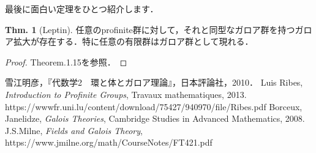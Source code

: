 \documentclass[dvipdfmx,b5paper,papersize]{jsarticle}
\theoremstyle{definition}
\newtheorem{thm}{Thm.}
\begin{document}
最後に面白い定理をひとつ紹介します．
\begin{thm}[Leptin]
  任意のprofinite群に対して，それと同型なガロア群を持つガロア拡大が存在する．特に任意の有限群はガロア群として現れる．
\end{thm}
\begin{proof}
 \cite{Ribes}Theorem.1.15を参照．
\end{proof}


\begin{thebibliography}{2}
   雪江明彦，『代数学2　環と体とガロア理論』，日本評論社，2010．
   Luis Ribes, {\sl Introduction to Profinite Groups}, Travaux mathematiques, 2013.{
  https://wwwfr.uni.lu/content/download/75427/940970/file/Ribes.pdf
  }
   Borceux, Janelidze, {\sl Galois Theories}, Cambridge Studies in Advanced Mathematics, 2008.
   J.S.Milne, {\sl Fields and Galois Theory}, {https://www.jmilne.org/math/CourseNotes/FT421.pdf}
\end{thebibliography}
\end{document}
